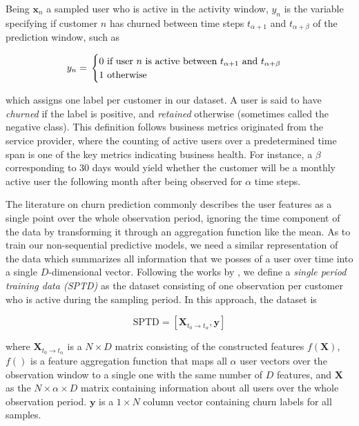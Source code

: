 \documentclass{kththesis}
\begin{document}
Being $\mathbf{x}_n$ a sampled user who is active in the activity window, $y_{n}$ is the variable specifying if customer $n$ has churned between time steps $t_{\alpha+1}$ and $t_{\alpha+\beta}$ of the prediction window, such as

\begin{equation}
y_n = \\ 
\begin{cases}
  \text{0 if user $n$ is active between $t_{\alpha+1}$ and $t_{\alpha+\beta}$} \\    
  \text{1 otherwise}    
\end{cases}
\end{equation}

which assigns one label per customer in our dataset. A user is said to have \emph{churned} if the label is positive, and \emph{retained} otherwise (sometimes called the negative class). This definition follows business metrics originated from the service provider, where the counting of active users over a predetermined time span is one of the key metrics indicating business health. For instance, a $\beta$ corresponding to 30 days would yield whether the customer will be a monthly active user the following month after being observed for $\alpha$ time steps. 

The literature on churn prediction commonly describes the user features as a single point over the whole observation period, ignoring the time component of the data by transforming it through an aggregation function like the mean. As to train our non-sequential predictive models, we need a similar representation of the data which summarizes all information that we posses of a user over time into a single $D$-dimensional vector. Following the works by \citep{GurAli2014}, we define a \emph{single period training data (SPTD)} as the dataset consisting of one observation per customer who is active during the sampling period. In this approach, the dataset is 

\begin{equation}
\text{SPTD} = [\mathbf{X}_{t_0 \rightarrow t_\alpha}, \mathbf{y}]
\end{equation}

where $\mathbf{X}_{t_0\rightarrow t_\alpha}$ is a $N \times D$ matrix consisting of the constructed features $f(\mathbf{X})$, $f()$ is a feature aggregation function that maps all $\alpha$ user vectors over the observation window to a single one with the same number of $D$ features, and  $\mathbf{X}$ as the $N \times \alpha \times D$ matrix containing information about all users over the whole observation period. $\mathbf{y}$ is a $1 \times N$ column vector containing churn labels for all samples. 
\end{document}
